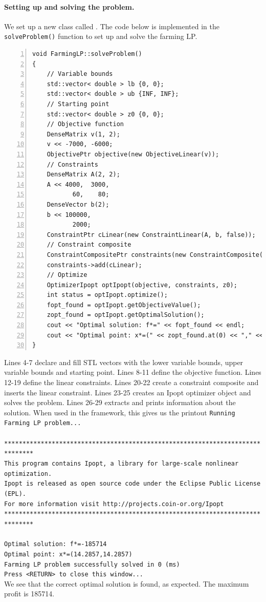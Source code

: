 \paragraph{Setting up and solving the problem.}
We set up a new  class called . The code below is implemented in the \texttt{solveProblem()} function to set up and solve the farming LP.
\begin{lstlisting}[numbers=left]
void FarmingLP::solveProblem()
{
	// Variable bounds
    std::vector< double > lb {0, 0};
    std::vector< double > ub {INF, INF};
    // Starting point
    std::vector< double > z0 {0, 0};
    // Objective function
    DenseMatrix v(1, 2);
    v << -7000, -6000;
    ObjectivePtr objective(new ObjectiveLinear(v));
    // Constraints
    DenseMatrix A(2, 2);
    A << 4000,  3000,
           60,    80;
    DenseVector b(2);
    b << 100000,
           2000;
    ConstraintPtr cLinear(new ConstraintLinear(A, b, false));
    // Constraint composite
    ConstraintCompositePtr constraints(new ConstraintComposite(2, lb, ub));
    constraints->add(cLinear);
    // Optimize
    OptimizerIpopt optIpopt(objective, constraints, z0);
    int status = optIpopt.optimize();
    fopt_found = optIpopt.getObjectiveValue();
    zopt_found = optIpopt.getOptimalSolution();
    cout << "Optimal solution: f*=" << fopt_found << endl;
    cout << "Optimal point: x*=(" << zopt_found.at(0) << "," << zopt_found.at(1) << ")" << endl;
}
\end{lstlisting}
Lines 4-7 declare and fill STL vectors with the lower variable bounds, upper variable bounds and starting point. Lines 8-11 define the objective function. Lines 12-19 define the linear constraints. Lines 20-22 create a constraint composite and inserts the linear constraint. Lines 23-25 creates an Ipopt optimizer object and solves the problem. Lines 26-29 extracts and prints information about the solution. When used in the  framework, this gives us the printout
\newline
{\footnotesize{\texttt{Running Farming LP problem...\\
\\
******************************************************************************\\
This program contains Ipopt, a library for large-scale nonlinear optimization.\\
 Ipopt is released as open source code under the Eclipse Public License (EPL).\\
         For more information visit http://projects.coin-or.org/Ipopt\\
******************************************************************************\\
\\
Optimal solution: f*=-185714\\
Optimal point: x*=(14.2857,14.2857)\\
Farming LP problem successfully solved in 0 (ms)\\
Press <RETURN> to close this window...\\
}}}
We see that the correct optimal solution is found, as expected. The maximum profit is 185714.

